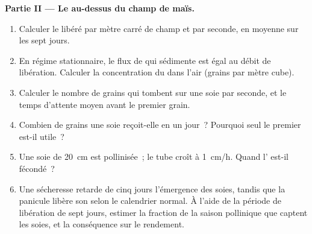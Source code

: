 \begin{problem}
\medskip
\noindent\textbf{Partie II --- Le  au-dessus du champ de maïs.}
\begin{enumerate}[resume]
  \item Calculer le  libéré par mètre carré de champ et par
        seconde, en moyenne sur les sept jours.
  \item En régime stationnaire, le flux de  qui sédimente est égal
        au débit de libération. Calculer la concentration du  dans
        l'air (grains par mètre cube).
  \item Calculer le nombre de grains qui tombent sur une soie par
        seconde, et le temps d'attente moyen avant le premier grain.
  \item Combien de grains une soie reçoit-elle en un jour~? Pourquoi
        seul le premier est-il utile~?
  \item Une soie de \qty{20}{cm} est pollinisée~; le tube croît à
        \qty{1}{cm/h}. Quand l' est-il fécondé~?
  \item Une sécheresse retarde de cinq jours l'émergence des soies,
        tandis que la panicule libère son  selon le calendrier
        normal. À l'aide de la période de libération de sept jours,
        estimer la fraction de la saison pollinique que captent les
        soies, et la conséquence sur le rendement.
\end{enumerate}


\end{problem}
